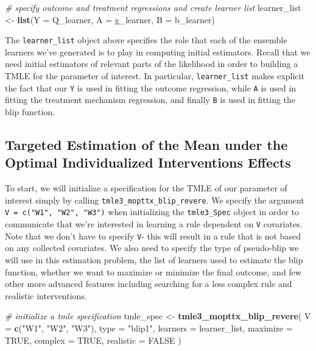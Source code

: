 \documentclass[12pt, krantz2,]{book}
\newenvironment{Shaded}{\begin{snugshade}}{\end{snugshade}}
\newcommand{\CommentTok}[1]{\textcolor[rgb]{0.56,0.35,0.01}{\textit{#1}}}
\newcommand{\DataTypeTok}[1]{\textcolor[rgb]{0.13,0.29,0.53}{#1}}
\newcommand{\KeywordTok}[1]{\textcolor[rgb]{0.13,0.29,0.53}{\textbf{#1}}}
\newcommand{\NormalTok}[1]{#1}
\newcommand{\OtherTok}[1]{\textcolor[rgb]{0.56,0.35,0.01}{#1}}
\newcommand{\StringTok}[1]{\textcolor[rgb]{0.31,0.60,0.02}{#1}}
\theoremstyle{definition}
\theoremstyle{definition}
\theoremstyle{definition}
\newcommand{\1}{\mathbbm{1}}
\begin{document}
\begin{Shaded}
\begin{Highlighting}[]
\CommentTok{# specify outcome and treatment regressions and create learner list}
\NormalTok{learner_list <-}\StringTok{ }\KeywordTok{list}\NormalTok{(}\DataTypeTok{Y =}\NormalTok{ Q_learner, }\DataTypeTok{A =}\NormalTok{ g_learner, }\DataTypeTok{B =}\NormalTok{ b_learner)}
\end{Highlighting}
\end{Shaded}

The \texttt{learner\_list} object above specifies the role that each of the ensemble
learners we've generated is to play in computing initial estimators. Recall that
we need initial estimators of relevant parts of the likelihood in order to
building a TMLE for the parameter of interest. In particular, \texttt{learner\_list}
makes explicit the fact that our \texttt{Y} is used in fitting the outcome regression,
while \texttt{A} is used in fitting the treatment mechanism regression, and finally \texttt{B}
is used in fitting the blip function.

\hypertarget{targeted-estimation-of-the-mean-under-the-optimal-individualized-interventions-effects}{%
\subsection{Targeted Estimation of the Mean under the Optimal Individualized Interventions Effects}\label{targeted-estimation-of-the-mean-under-the-optimal-individualized-interventions-effects}}

To start, we will initialize a specification for the TMLE of our parameter of
interest simply by calling \texttt{tmle3\_mopttx\_blip\_revere}. We specify the argument
\texttt{V\ =\ c("W1",\ "W2",\ "W3")} when initializing the \texttt{tmle3\_Spec} object in order to
communicate that we're interested in learning a rule dependent on \texttt{V}
covariates. Note that we don't have to specify \texttt{V}- this will result in a rule
that is not based on any collected covariates. We also need to specify the type
of pseudo-blip we will use in this estimation problem, the list of learners used
to estimate the blip function, whether we want to maximize or minimize the final
outcome, and few other more advanced features including searching for a less
complex rule and realistic interventions.

\begin{Shaded}
\begin{Highlighting}[]
\CommentTok{# initialize a tmle specification}
\NormalTok{tmle_spec <-}\StringTok{ }\KeywordTok{tmle3_mopttx_blip_revere}\NormalTok{(}
  \DataTypeTok{V =} \KeywordTok{c}\NormalTok{(}\StringTok{"W1"}\NormalTok{, }\StringTok{"W2"}\NormalTok{, }\StringTok{"W3"}\NormalTok{), }\DataTypeTok{type =} \StringTok{"blip1"}\NormalTok{,}
  \DataTypeTok{learners =}\NormalTok{ learner_list,}
  \DataTypeTok{maximize =} \OtherTok{TRUE}\NormalTok{, }\DataTypeTok{complex =} \OtherTok{TRUE}\NormalTok{, }\DataTypeTok{realistic =} \OtherTok{FALSE}
\NormalTok{)}
\end{Highlighting}
\end{Shaded}
\end{document}
